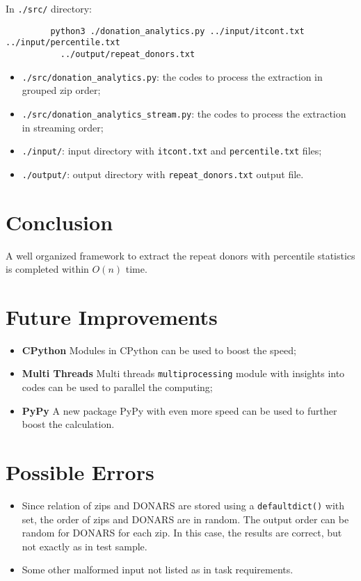 \documentclass[twoside]{article}
\begin{document}
\hspace{4ex} In \verb|./src/| directory:

\begin{verbatim}
         python3 ./donation_analytics.py ../input/itcont.txt ../input/percentile.txt 
           ../output/repeat_donors.txt
\end{verbatim}

\begin{itemize}
\item \verb|./src/donation_analytics.py|: the codes to process the extraction in grouped zip order;
\item \verb|./src/donation_analytics_stream.py|: the codes to process the extraction in streaming order;
\item \verb|./input/|: input directory with \verb|itcont.txt| and \verb|percentile.txt| files;
\item \verb|./output/|: output directory with \verb|repeat_donors.txt| output file.
\end{itemize}
 
  
 \section{Conclusion}
 
 A well organized framework to extract the repeat donors with percentile statistics is completed within $O(n)$ time. 

  \section{Future Improvements}
 \begin{itemize}
 \item \textbf{CPython} Modules in CPython can be used to boost the speed;
 
 \item \textbf{Multi Threads} Multi threads \verb|multiprocessing| module with insights into codes can be used to parallel the computing; 
 
 \item \textbf{PyPy} A new package PyPy with even more speed can be used to further boost the calculation.
 \end{itemize}
 
  \section{Possible Errors}
 \begin{itemize}
 \item Since relation of zips and DONARS are stored using a \verb|defaultdict()| with set, the order of zips and DONARS are in random. The output order can be random for DONARS for each zip. In this case, the results are correct, but not exactly as in test sample. 
 \item Some other malformed input not listed as in task requirements. 
 \end{itemize}
\end{document}
